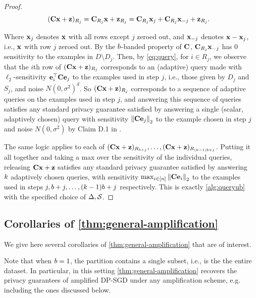 \documentclass{article}
\begin{document}
\begin{proof}
\begin{equation}\label{eq:query}
(\mathbf{C} \mathbf{x} + \mathbf{z})_{R_j} = \mathbf{C}_{R_j} \mathbf{x} + \mathbf{z}_{R_j} = \mathbf{C}_{R_j} \mathbf{x}_j + \mathbf{C}_{R_j} \mathbf{x}_{-j} + \mathbf{z}_{R_j}.
\end{equation}

Where $\mathbf{x}_j$ denotes $\mathbf{x}$ with all rows except $j$ zeroed out, and $\mathbf{x}_{-j}$ denotes $\mathbf{x} - \mathbf{x}_j$, i.e., $\mathbf{x}$ with row $j$ zeroed out. By the $b$-banded property of $\mathbf{C}$, $\mathbf{C}_{R_j} \mathbf{x}_{-j}$ has 0 sensitivity to the examples in $D \setminus D_j$. Then, by \cref{eq:query}, for $i \in R_j$, we observe that the $i$th row of $(\mathbf{C} \mathbf{x} + \mathbf{z})_{R_j}$ corresponds to an (adaptive) query made with $\ell_2$-sensitivity $\mathbf{e}_i^\top \mathbf{C} \mathbf{e}_j$ to the examples used in step $j$, i.e., those given by $D_j$ and $S_j$, and noise $N(0, \sigma^2)^d$. So $(\mathbf{C} \mathbf{x} + \mathbf{z})_{R_j}$ corresponds to a sequence of adaptive queries on the examples used in step $j$, and answering this sequence of queries satisfies any standard privacy guarantee satisfied by answering a single (scalar, adaptively chosen) query with sensitivity $\left\|\mathbf{C} \mathbf{e}_j\right\|_2$ to the example chosen in step $j$ and noise $N(0, \sigma^2)$ by Claim D.1 in \cite{denisov22matfact}.

The same logic applies to each of $(\mathbf{C} \mathbf{x} + \mathbf{z})_{R_{b + j}}, \ldots, (\mathbf{C} \mathbf{x} + \mathbf{z})_{R_{(k - 1) b + j}}$. Putting it all together and taking a max over the sensitivity of the individual queries, releasing $\mathbf{C} \mathbf{x} + \mathbf{z}$ satisfies any standard privacy guarantee satisfied by answering $k$ adaptively chosen queries, with sensitivity $\max_{i \in [n]} \left\|\mathbf{C} \mathbf{e}_i\right\|_2$ to the examples used in steps $j, b + j, \ldots, (k - 1) b + j$ respectively. This is exactly \cref{alg:queryub} with the specified choice of $\Delta, \mathcal{S}$.
\end{proof}
\subsection{Corollaries of \cref{thm:general-amplification}}\label{sec:amp-corollaries}

We give here several corollaries of \cref{thm:general-amplification} that are of interest.

 Note that when $b = 1$, the partition contains a single subset, i.e., is the the entire dataset. In particular, in this setting \cref{thm:general-amplification} recovers the privacy guarantees of amplified DP-SGD under any amplification scheme, e.g. including the ones discussed below.
\end{document}
